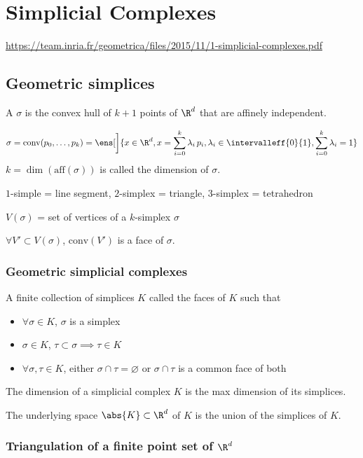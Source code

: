 \chapter{Simplicial Complexes}
\url{https://team.inria.fr/geometrica/files/2015/11/1-simplicial-complexes.pdf}

\section{Geometric simplices}

\begin{defi}
    A  $\sigma$ is the convex hull of $k+1$ points of $\R^d$ that are affinely independent. 
\end{defi}

\[
\sigma = \mathrm{conv}(p_0, \dots, p_k) = \ens[\bigg]{x \in \R^d, x = \sum_{i=0}^k \lambda_i \, p_i, \lambda_i \in \intervalleff{0}{1}, \sum_{i=0}^k \lambda_i = 1}
\]
$k = \dim(\mathrm{aff}(\sigma))$ is called the dimension of $\sigma$.

$1$-simple = line segment, $2$-simplex = triangle, $3$-simplex = tetrahedron

$V(\sigma)$ = set of vertices of a $k$-simplex $\sigma$

$\forall V' \subset V(\sigma)$, $\mathrm{conv}(V')$ is a face of $\sigma$.

\subsection{Geometric simplicial complexes}

A finite collection of simplices $K$ called the faces of $K$ such that
\begin{itemize}
    \item $\forall \sigma \in K$, $\sigma$ is a simplex
    \item $\sigma \in K$, $\tau \subset \sigma \implies \tau \in K$
    \item $\forall \sigma, \tau \in K$, either $\sigma \cap \tau = \varnothing$ or $\sigma \cap \tau$ is a common face of both
\end{itemize}

The dimension of a simplicial complex $K$ is the max dimension of its simplices.

The underlying space $\abs{K} \subset \R^d$ of $K$ is the union of the simplices of $K$. 

\subsection{Triangulation of a finite point set of \texorpdfstring{$\R^d$}{Rd}}

